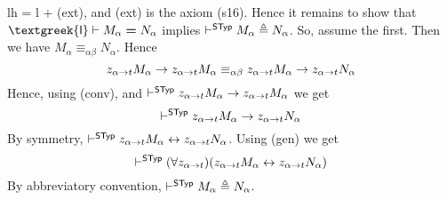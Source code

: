 \proofbeg 
{\sf\textgreek{lh}} = {\sf\textgreek{l}} + (ext), and
(ext) is the axiom (s16). Hence it remains to show that 
$\mbox{\sf\textgreek{l}} \vdash M_{\alpha} \boldsymbol{\doteq} 
N_{\alpha}$ implies $\vdash^{\mathsf{STyp}} M_{\alpha} 
\triangleq N_{\alpha}$. So, assume the first. Then we have $M_{\alpha}
\equiv_{\alpha\beta} N_{\alpha}$. Hence
\begin{equation}
z_{\alpha\rightarrow t}M_{\alpha} \rightarrow z_{\alpha\rightarrow t}M_{\alpha}
\equiv_{\alpha\beta} z_{\alpha\rightarrow t}M_{\alpha} \rightarrow z_{\alpha\rightarrow
t}N_{\alpha}
\end{equation}
Hence, using (conv), and $\vdash^{\mathsf{STyp}} 
z_{\alpha \rightarrow t}M_{\alpha} \rightarrow z_{\alpha\rightarrow t}M_{\alpha}$
we get 
\begin{equation}
\vdash^{\mathsf{STyp}} z_{\alpha\rightarrow t}M_{\alpha}
\rightarrow z_{\alpha\rightarrow t}N_{\alpha}
\end{equation}
By symmetry, $\vdash^{\mathsf{STyp}} z_{\alpha\rightarrow t}M_{\alpha}
\leftrightarrow z_{\alpha\rightarrow t}N_{\alpha}$.
Using (gen)  we get
\begin{equation}
\vdash^{\mathsf{STyp}} (\forall z_{\alpha \pf t})%
(z_{\alpha\pf t}M_{\alpha} \dpf z_{\alpha\pf t}N_{\alpha})
\end{equation}
By abbreviatory convention, $\vdash^{\mathsf{STyp}} 
M_{\alpha} \triangleq N_{\alpha}$. 
\proofend

